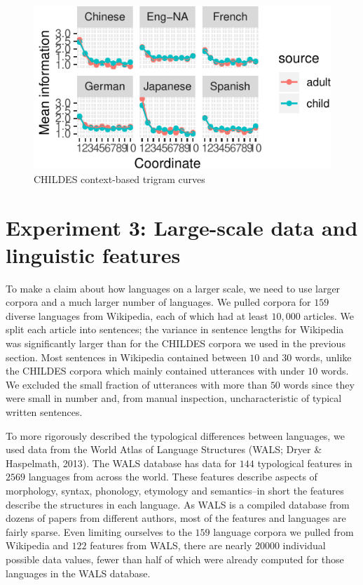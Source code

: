 \documentclass[10pt, letterpaper]{article}
\newenvironment{CodeChunk}{}{}
\begin{document}
\begin{CodeChunk}
\begin{figure}[tb]
\includegraphics{figs/childestrigrams-1} \caption[CHILDES context-based trigram curves]{CHILDES context-based trigram curves}\label{fig:childestrigrams}
\end{figure}
\end{CodeChunk}

\hypertarget{experiment-3-large-scale-data-and-linguistic-features}{%
\section{Experiment 3: Large-scale data and linguistic
features}\label{experiment-3-large-scale-data-and-linguistic-features}}

To make a claim about how languages on a larger scale, we need to use
larger corpora and a much larger number of languages. We pulled corpora
for \(159\) diverse languages from Wikipedia, each of which had at least
\(10,000\) articles. We split each article into sentences; the variance
in sentence lengths for Wikipedia was significantly larger than for the
CHILDES corpora we used in the previous section. Most sentences in
Wikipedia contained between \(10\) and \(30\) words, unlike the CHILDES
corpora which mainly contained utterances with under \(10\) words. We
excluded the small fraction of utterances with more than \(50\) words
since they were small in number and, from manual inspection,
uncharacteristic of typical written sentences.

To more rigorously described the typological differences between
languages, we used data from the World Atlas of Language Structures
(WALS; Dryer \& Haspelmath, 2013). The WALS database has data for
\(144\) typological features in \(2569\) languages from across the
world. These features describe aspects of morphology, syntax, phonology,
etymology and semantics--in short the features describe the structures
in each language. As WALS is a compiled database from dozens of papers
from different authors, most of the features and languages are fairly
sparse. Even limiting ourselves to the \(159\) language corpora we
pulled from Wikipedia and \(122\) features from WALS, there are nearly
\(20000\) individual possible data values, fewer than half of which were
already computed for those languages in the WALS database.
\end{document}
